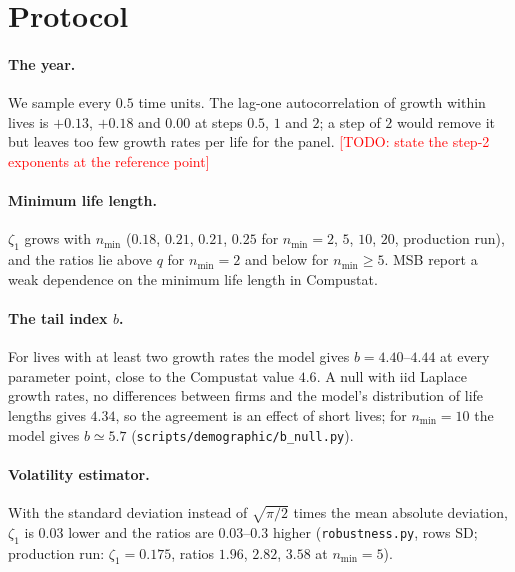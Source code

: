 \documentclass[pre,onecolumn,superscriptaddress,nofootinbib]{revtex4-2}
\newcommand{\todo}[1]{\textcolor{red}{[TODO: #1]}}
\begin{document}
\section{Protocol}
\label{sec:protocol}

\paragraph{The year.}  We sample every $0.5$ time units.  The lag-one autocorrelation of growth within
lives is $+0.13$, $+0.18$ and $0.00$ at steps $0.5$, $1$ and $2$; a step of $2$ would remove it but leaves
too few growth rates per life for the panel.  \todo{state the step-2 exponents at the reference point}

\paragraph{Minimum life length.}  $\zeta_1$ grows with $n_{\min}$ ($0.18$, $0.21$, $0.21$, $0.25$ for $n_{\min}=2$,
$5$, $10$, $20$, production run), and the ratios lie above $q$ for $n_{\min}=2$ and below for $n_{\min}\ge5$.  MSB report a weak
dependence on the minimum life length in Compustat.

\paragraph{The tail index $b$.}  For lives with at least two growth rates the model gives
$b=4.40$--$4.44$ at every parameter point, close to the Compustat value $4.6$.  A null with iid Laplace
growth rates, no differences between firms and the model's distribution of life lengths gives
$4.34$, so the agreement is an effect of short lives; for $n_{\min}=10$ the model gives $b\simeq5.7$
(\texttt{scripts/demographic/b\_null.py}).

\paragraph{Volatility estimator.}  With the standard deviation instead of $\sqrt{\pi/2}$ times the mean
absolute deviation, $\zeta_1$ is $0.03$ lower and the ratios are $0.03$--$0.3$ higher (\texttt{robustness.py},
rows SD; production run: $\zeta_1=0.175$, ratios $1.96$, $2.82$, $3.58$ at $n_{\min}=5$).


\end{document}
